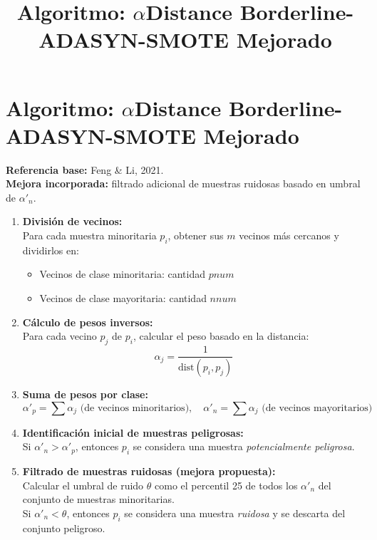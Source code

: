 \documentclass[12pt]{article}
\title{Algoritmo: $\alpha$Distance Borderline-ADASYN-SMOTE Mejorado}
\date{}
\begin{document}
\maketitle

\section*{Algoritmo: $\alpha$Distance Borderline-ADASYN-SMOTE Mejorado}

\textbf{Referencia base:} Feng \& Li, 2021.\\
\textbf{Mejora incorporada:} filtrado adicional de muestras ruidosas basado en umbral de $\alpha'_n$.

\begin{enumerate}[label=\textbf{\arabic*.}]
    \item \textbf{División de vecinos:}\\
    Para cada muestra minoritaria \( p_i \), obtener sus \( m \) vecinos más cercanos y dividirlos en:
    \begin{itemize}
        \item Vecinos de clase minoritaria: cantidad \( pnum \)
        \item Vecinos de clase mayoritaria: cantidad \( nnum \)
    \end{itemize}

    \item \textbf{Cálculo de pesos inversos:}\\
    Para cada vecino \( p_j \) de \( p_i \), calcular el peso basado en la distancia:
    \[
    \alpha_j = \frac{1}{\text{dist}(p_i, p_j)}
    \]

    \item \textbf{Suma de pesos por clase:}
    \[
    \alpha'_p = \sum \alpha_j \text{ (de vecinos minoritarios)}, \quad 
    \alpha'_n = \sum \alpha_j \text{ (de vecinos mayoritarios)}
    \]

    \item \textbf{Identificación inicial de muestras peligrosas:}\\
    Si \( \alpha'_n > \alpha'_p \), entonces \( p_i \) se considera una muestra \emph{potencialmente peligrosa}.

    \item \textbf{Filtrado de muestras ruidosas (mejora propuesta):}\\
    Calcular el umbral de ruido \( \theta \) como el percentil 25 de todos los \( \alpha'_n \) del conjunto de muestras minoritarias.\\
    Si \( \alpha'_n < \theta \), entonces \( p_i \) se considera una muestra \emph{ruidosa} y se descarta del conjunto peligroso.


\end{enumerate}
\end{document}
